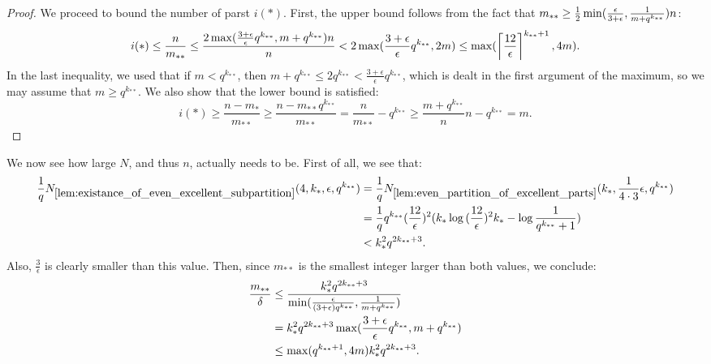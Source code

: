 \begin{theorem}
\begin{proof}
                We proceed to bound the number of parst $i(*)$.
                First, the upper bound follows from the fact that
                $m_{**} \geq \frac{1}{2} \min ( \frac{\epsilon} {3 + \epsilon}, \frac{1}{m + q^{k_{**}}} ) n$:
                \[
                    i(*) \leq \frac{n}{m_{**}} \leq \frac{2 \max ( \frac{3 + \epsilon}{\epsilon} q^{k_{**}}, m + q^{k_{**}} )n}{n}
                         < 2 \max ( \frac{3 + \epsilon}{\epsilon} q^{k_{**}}, 2m )
                         \leq \max ( \left\lceil \frac{12}{\epsilon} \right\rceil^{k_{**}+1}, 4m ).
                \]
                In the last inequality, we used that if $m < q^{k_{**}}$, then $m + q^{k_{**}} \leq 2q^{k_{**}} < \frac{3 + \epsilon}{\epsilon} q^{k_{**}}$,
                which is dealt in the first argument of the maximum, so we may assume that $m \geq q^{k_{**}}$.
                We also show that the lower bound is satisfied:
                \[
                    i(*) \geq \frac{n - m_*}{m_{**}}
                         \geq \frac{n - m_{**}q^{k_{**}}}{m_{**}}
                         = \frac{n}{m_{**}} - q^{k_{**}}
                         \geq \frac{m + q^{k_{**}}}{n} n - q^{k_{**}}
                         = m.
                \]
            \end{proof}
        \end{theorem}

        \begin{remark}
            We now see how large $N$, and thus $n$, actually needs to be.
            First of all, we see that:
            \begin{align*}
                \frac{1}{q} N_{\ref{lem:existance_of_even_excellent_subpartition}}( 4, k_*, \epsilon, q^{k_{**}} )
                    & = \frac{1}{q} N_{\ref{lem:even_partition_of_excellent_parts}}( k_*, \frac{1}{4 \cdot 3} \epsilon, q^{k_{**}} ) \\
                    & = \frac{1}{q} q^{k_{**}} ( \frac{12}{\epsilon} )^2
                        ( k_* \log{( \frac{12}{\epsilon} )^2 k_*} - \log{\frac{1}{q^{k_{**}}+1}} ) \\
                    & < k_*^2 q^{2 k_{**} + 3}.
            \end{align*}
            Also, $\frac{3}{\epsilon}$ is clearly smaller than this value.
            Then, since $m_{**}$ is the smallest integer larger than both values, we conclude:
            \begin{align*}
                \frac{m_{**}}{\delta}
                    & \leq \frac{k_*^2 q^{2 k_{**} + 3}}
                        {\min ( \frac{\epsilon}{( 3 + \epsilon ) q^{k_{**}}}, \frac{1}{m + q^{k_{**}}} )} \\
                    & = k_*^2 q^{2 k_{**} + 3} \max ( \frac{3 + \epsilon}{\epsilon} q^{k_{**}}, m + q^{k_{**}} ) \\
                    & \leq \max ( q^{k_{**} + 1}, 4m ) k_*^2 q^{2 k_{**} + 3}.
            \end{align*}
        \end{remark}

